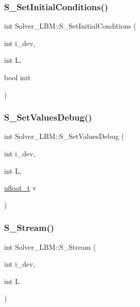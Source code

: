 \subsubsection{\texorpdfstring{S\+\_\+\+Set\+Initial\+Conditions()}{S\_SetInitialConditions()}}
{\footnotesize\ttfamily int Solver\+\_\+\+L\+B\+M\+::\+S\+\_\+\+Set\+Initial\+Conditions (\begin{DoxyParamCaption}\item[{int}]{i\+\_\+dev,  }\item[{int}]{L,  }\item[{bool}]{init }\end{DoxyParamCaption})}

\mbox{\label{classSolver__LBM_abf91dd13737bd2232d191e21c20cbc33}} 
\subsubsection{\texorpdfstring{S\+\_\+\+Set\+Values\+Debug()}{S\_SetValuesDebug()}}
{\footnotesize\ttfamily int Solver\+\_\+\+L\+B\+M\+::\+S\+\_\+\+Set\+Values\+Debug (\begin{DoxyParamCaption}\item[{int}]{i\+\_\+dev,  }\item[{int}]{L,  }\item[{\hyperlink{cppspec_8h_af529d360dfac9b9578aa719418a53a21}{ufloat\+\_\+t}}]{v }\end{DoxyParamCaption})}

\mbox{\label{classSolver__LBM_ad301e7ccad5f700a94a12762f92939db}} 
\subsubsection{\texorpdfstring{S\+\_\+\+Stream()}{S\_Stream()}}
{\footnotesize\ttfamily int Solver\+\_\+\+L\+B\+M\+::\+S\+\_\+\+Stream (\begin{DoxyParamCaption}\item[{int}]{i\+\_\+dev,  }\item[{int}]{L }\end{DoxyParamCaption})}

